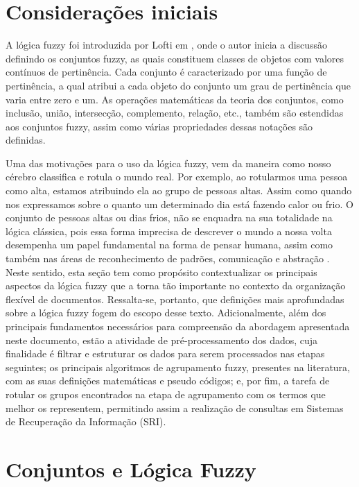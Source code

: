 \section{Considerações iniciais}
A lógica fuzzy foi introduzida por Lofti  em \citeyear{Zadeh1965}, onde
o autor inicia a discussão definindo os conjuntos fuzzy, as quais constituem classes de objetos com
valores contínuos de pertinência. Cada conjunto é caracterizado por uma função de pertinência, a
qual atribui a cada objeto do conjunto um grau de pertinência que varia entre zero e um. As
operações matemáticas da teoria dos conjuntos, como inclusão, união, intersecção, complemento,
relação, etc., também são estendidas aos conjuntos fuzzy, assim como várias propriedades dessas
notações são definidas.

Uma das motivações para o uso da lógica fuzzy, vem da maneira como nosso cérebro classifica e rotula
o mundo real. Por exemplo, ao rotularmos uma pessoa como alta, estamos atribuindo ela ao grupo de
pessoas altas. Assim como quando nos expressamos sobre o quanto um determinado dia está fazendo
calor ou frio. O conjunto de pessoas altas ou dias frios, não se enquadra na sua totalidade na
lógica clássica, pois essa forma imprecisa de descrever o mundo a nossa volta desempenha um papel
fundamental na forma de pensar humana, assim como também nas áreas de reconhecimento de padrões,
comunicação e abstração \cite{Zadeh1965}.  Neste sentido, esta seção tem como propósito
contextualizar os principais aspectos da lógica fuzzy que a torna tão importante no contexto da
organização flexível de documentos. Ressalta-se, portanto, que definições mais aprofundadas sobre a
lógica fuzzy fogem do escopo desse texto.  Adicionalmente, além dos principais fundamentos
necessários para compreensão da abordagem apresentada neste documento, estão a atividade de
pré-processamento dos dados, cuja finalidade é filtrar e estruturar os dados para serem processados
nas etapas seguintes; os principais algoritmos de agrupamento fuzzy, presentes na literatura, com as
suas definições matemáticas e pseudo códigos; e, por fim, a tarefa de rotular os grupos
encontrados na etapa de agrupamento com os termos que melhor os representem, permitindo assim a
realização de consultas em Sistemas de Recuperação da Informação
(SRI).

\section{Conjuntos e Lógica Fuzzy}

